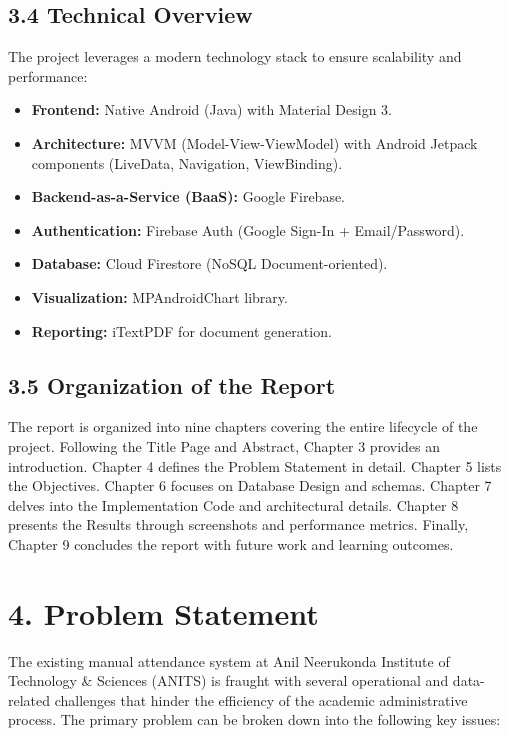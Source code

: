 \documentclass[12pt,a4paper]{report}
\begin{document}
\section*{3.4 Technical Overview}
The project leverages a modern technology stack to ensure scalability and performance:
\begin{itemize}
    \item \textbf{Frontend:} Native Android (Java) with Material Design 3.
    \item \textbf{Architecture:} MVVM (Model-View-ViewModel) with Android Jetpack components (LiveData, Navigation, ViewBinding).
    \item \textbf{Backend-as-a-Service (BaaS):} Google Firebase.
    \item \textbf{Authentication:} Firebase Auth (Google Sign-In + Email/Password).
    \item \textbf{Database:} Cloud Firestore (NoSQL Document-oriented).
    \item \textbf{Visualization:} MPAndroidChart library.
    \item \textbf{Reporting:} iTextPDF for document generation.
\end{itemize}

\section*{3.5 Organization of the Report}
The report is organized into nine chapters covering the entire lifecycle of the project. Following the Title Page and Abstract, Chapter 3 provides an introduction. Chapter 4 defines the Problem Statement in detail. Chapter 5 lists the Objectives. Chapter 6 focuses on Database Design and schemas. Chapter 7 delves into the Implementation Code and architectural details. Chapter 8 presents the Results through screenshots and performance metrics. Finally, Chapter 9 concludes the report with future work and learning outcomes.

\chapter*{4. Problem Statement}

The existing manual attendance system at Anil Neerukonda Institute of Technology \& Sciences (ANITS) is fraught with several operational and data-related challenges that hinder the efficiency of the academic administrative process. The primary problem can be broken down into the following key issues:
\end{document}
